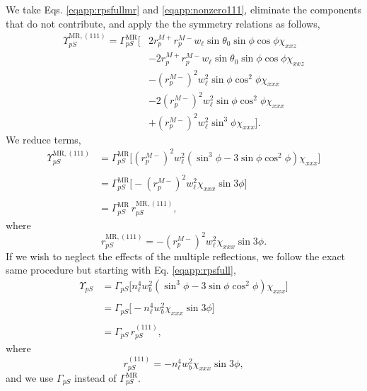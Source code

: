 We take Eqs. \eqref{eqapp:rpsfullmr} and \eqref{eqapp:nonzero111}, eliminate the
components that do not contribute, and apply the the symmetry relations as
follows,
\begin{equation*}
\begin{split}
\Upsilon^{\mathrm{MR},(111)}_{pS} = 
\Gamma^{\mathrm{MR}}_{pS}
\big[
&  2r^{M+}_{p}r^{M-}_{p}w_{\ell}\sin\theta_{0}\sin\phi\cos\phi\chi_{xxz}\\
&- 2r^{M+}_{p}r^{M-}_{p}w_{\ell}\sin\theta_{0}\sin\phi\cos\phi\chi_{xxz}\\
&-  \left(r^{M-}_{p}\right)^{2}w^{2}_{\ell}\sin\phi\cos^{2}\phi\chi_{xxx}\\
&- 2\left(r^{M-}_{p}\right)^{2}w^{2}_{\ell}\sin\phi\cos^{2}\phi\chi_{xxx}\\
&+ \left(r^{M-}_{p}\right)^{2}w^{2}_{\ell}\sin^{3}\phi\chi_{xxx}
\big].
\end{split}
\end{equation*}
We reduce terms,
\begin{equation*}
\begin{split}
\Upsilon^{\mathrm{MR},(111)}_{pS} &=
\Gamma^{\mathrm{MR}}_{pS}
\big[
\left(r^{M-}_{p}\right)^{2}w^{2}_{\ell}
      (\sin^{3}\phi - 3\sin\phi\cos^{2}\phi)\chi_{xxx}
\big]\\\\
&=
\Gamma^{\mathrm{MR}}_{pS}
\big[
- \left(r^{M-}_{p}\right)^{2}w^{2}_{\ell}\chi_{xxx}\sin3\phi
\big]\\\\
& = \Gamma^{\mathrm{MR}}_{pS}\,r^{\mathrm{MR},(111)}_{pS},
\end{split}
\end{equation*}
where
\begin{equation}\label{eqapp:final-rps.mr.111}
r^{\mathrm{MR},(111)}_{pS} = 
- \left(r^{M-}_{p}\right)^{2}w^{2}_{\ell}\chi_{xxx}\sin3\phi.
\end{equation}
If we wish to neglect the effects of the multiple reflections, we follow the
exact same procedure but starting with Eq. \eqref{eqapp:rpsfull},
\begin{equation}
\begin{split}
\Upsilon_{pS} &= 
\Gamma_{pS}
\big[
n^{4}_{\ell}w^{2}_{b}(\sin^{3}\phi - 3\sin\phi\cos^{2}\phi)\chi_{xxx}
\big]\\\\
&= \Gamma_{pS}
\big[
- n^{4}_{\ell}w^{2}_{b}\chi_{xxx}\sin3\phi
\big]\\\\
&= \Gamma_{pS}\,r^{(111)}_{pS},
\end{split}
\end{equation}
where
\begin{equation}\label{eqapp:final-rps.111}
r^{(111)}_{pS} = - n^{4}_{\ell}w^{2}_{b}\chi_{xxx}\sin3\phi,
\end{equation}
and we use $\Gamma_{pS}$ instead of $\Gamma^{\mathrm{MR}}_{pS}$.



